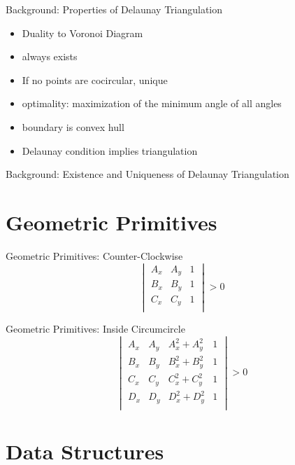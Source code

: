 \documentclass[aspectratio=169]{beamer}
\begin{document}
\begin{frame}{Background: Properties of Delaunay Triangulation}
  \begin{itemize}
    \item Duality to Voronoi Diagram
    \item always exists
    \item If no points are cocircular, unique
    \item optimality: maximization of the minimum angle of all angles
    \item boundary is convex hull
    \item Delaunay condition implies triangulation
  \end{itemize}
\end{frame}

\begin{frame}{Background: Existence and Uniqueness of Delaunay Triangulation}
\end{frame}

\section{Geometric Primitives}
\begin{frame}{Geometric Primitives: Counter-Clockwise}
  \[
    \begin{vmatrix}
      A_x & A_y & 1 \\
      B_x & B_y & 1 \\
      C_x & C_y & 1 \\
    \end{vmatrix}
    > 0
  \]
\end{frame}

\begin{frame}{Geometric Primitives: Inside Circumcircle}
  \[
    \begin{vmatrix}
      A_x & A_y & A_x^2 + A_y^2 & 1 \\
      B_x & B_y & B_x^2 + B_y^2 & 1 \\
      C_x & C_y & C_x^2 + C_y^2 & 1 \\
      D_x & D_y & D_x^2 + D_y^2 & 1 \\
    \end{vmatrix}
    > 0
  \]
\end{frame}

\section{Data Structures}
\end{document}
